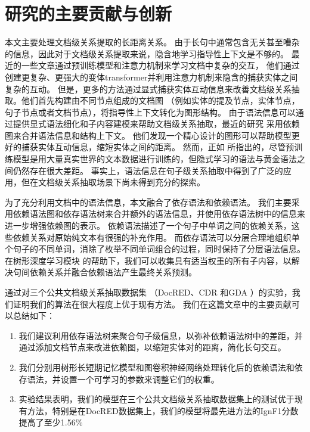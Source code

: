 \documentclass[bachelor]{thesis-uestc}
\begin{document}
\section{研究的主要贡献与创新}
本文主要处理文档级关系提取的长距离关系。
由于长句中通常包含无关甚至嘈杂的信息，因此对于文档级关系提取来说，隐含地学习指导性上下文是不够的。
最近的一些文章通过预训练模型和注意力机制来学习文档中复杂的交互， 他们通过创建更复杂、更强大的变体transformer并利用注意力机制来隐含的捕获实体之间复杂的互动。
但是，更多的方法通过显式捕获实体互动信息来改善文档级关系抽取。他们首先构建由不同节点组成的文档图 （例如实体的提及节点，实体节点，句子节点或者文档节点），将指导性上下文转化为图形结构。
由于语法信息可以通过提供显式语法细化和子内容建模来帮助文档级关系抽取，最近的研究 采用依赖图来合并语法信息和结构上下文。
他们发现一个精心设计的图形可以帮助模型更好的捕获实体互动信息，缩短实体之间的距离。
然而，正如 \cite{bai-etal-2021-syntax}所指出的，尽管预训练模型是用大量真实世界的文本数据进行训练的，但隐式学习的语法与黄金语法之间仍然存在很大差距。
事实上，语法信息在句子级关系抽取中得到了广泛的应用，但在文档级关系抽取场景下尚未得到充分的探索。\par

为了充分利用文档中的语法信息，本文融合了依存语法和依赖语法。
我们主要采用依赖语法图和依存语法树来合并额外的语法信息，并使用依存语法树中的信息来进一步增强依赖图的表示。
依赖语法描述了一个句子中单词之间的依赖关系，这些依赖关系对原始纯文本有很强的补充作用。
而依存语法可以分层合理地组织单个句子的不同单词，消除了枚举不同单词组合的过程，同时保持了分层语法信息。
在树形深度学习模块 \cite{duan-etal-2022-just} 的帮助下，我们可以收集具有适当权重的所有子内容，以解决句间依赖关系并融合依赖语法产生最终关系预测。\par


通过对三个公共文档级关系抽取数据集 （DocRED、CDR 和GDA ）的实验，我们证明我们的算法在很大程度上优于现有方法。
我们在这篇文章中的主要贡献可以总结如下：
\begin{enumerate}
    \item 我们建议利用依存语法树来聚合句子级信息，以弥补依赖语法树中的差距，并通过添加文档节点来改进依赖图，以缩短实体对的距离，简化长句交互。
    \item 我们分别用树形长短期记忆模型和图卷积神经网络处理转化后的依赖语法和依存语法，并设置一个可学习的参数来调整它们的权重。
    \item 实验结果表明，我们的模型在三个公共文档级关系抽取数据集上的测试优于现有方法，特别是在DocRED数据集上，我们的模型将最先进方法的IgnF1分数提高了至少1.56\%
\end{enumerate}
\end{document}
